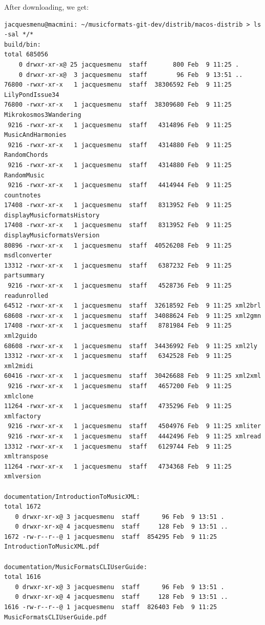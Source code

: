 
After downloading, we get:
\begin{lstlisting}[language=Terminal]
jacquesmenu@macmini: ~/musicformats-git-dev/distrib/macos-distrib > ls -sal */*
build/bin:
total 685056
    0 drwxr-xr-x@ 25 jacquesmenu  staff       800 Feb  9 11:25 .
    0 drwxr-xr-x@  3 jacquesmenu  staff        96 Feb  9 13:51 ..
76800 -rwxr-xr-x   1 jacquesmenu  staff  38306592 Feb  9 11:25 LilyPondIssue34
76800 -rwxr-xr-x   1 jacquesmenu  staff  38309680 Feb  9 11:25 Mikrokosmos3Wandering
 9216 -rwxr-xr-x   1 jacquesmenu  staff   4314896 Feb  9 11:25 MusicAndHarmonies
 9216 -rwxr-xr-x   1 jacquesmenu  staff   4314880 Feb  9 11:25 RandomChords
 9216 -rwxr-xr-x   1 jacquesmenu  staff   4314880 Feb  9 11:25 RandomMusic
 9216 -rwxr-xr-x   1 jacquesmenu  staff   4414944 Feb  9 11:25 countnotes
17408 -rwxr-xr-x   1 jacquesmenu  staff   8313952 Feb  9 11:25 displayMusicformatsHistory
17408 -rwxr-xr-x   1 jacquesmenu  staff   8313952 Feb  9 11:25 displayMusicformatsVersion
80896 -rwxr-xr-x   1 jacquesmenu  staff  40526208 Feb  9 11:25 msdlconverter
13312 -rwxr-xr-x   1 jacquesmenu  staff   6387232 Feb  9 11:25 partsummary
 9216 -rwxr-xr-x   1 jacquesmenu  staff   4528736 Feb  9 11:25 readunrolled
64512 -rwxr-xr-x   1 jacquesmenu  staff  32618592 Feb  9 11:25 xml2brl
68608 -rwxr-xr-x   1 jacquesmenu  staff  34088624 Feb  9 11:25 xml2gmn
17408 -rwxr-xr-x   1 jacquesmenu  staff   8781984 Feb  9 11:25 xml2guido
68608 -rwxr-xr-x   1 jacquesmenu  staff  34436992 Feb  9 11:25 xml2ly
13312 -rwxr-xr-x   1 jacquesmenu  staff   6342528 Feb  9 11:25 xml2midi
60416 -rwxr-xr-x   1 jacquesmenu  staff  30426688 Feb  9 11:25 xml2xml
 9216 -rwxr-xr-x   1 jacquesmenu  staff   4657200 Feb  9 11:25 xmlclone
11264 -rwxr-xr-x   1 jacquesmenu  staff   4735296 Feb  9 11:25 xmlfactory
 9216 -rwxr-xr-x   1 jacquesmenu  staff   4504976 Feb  9 11:25 xmliter
 9216 -rwxr-xr-x   1 jacquesmenu  staff   4442496 Feb  9 11:25 xmlread
13312 -rwxr-xr-x   1 jacquesmenu  staff   6129744 Feb  9 11:25 xmltranspose
11264 -rwxr-xr-x   1 jacquesmenu  staff   4734368 Feb  9 11:25 xmlversion

documentation/IntroductionToMusicXML:
total 1672
   0 drwxr-xr-x@ 3 jacquesmenu  staff      96 Feb  9 13:51 .
   0 drwxr-xr-x@ 4 jacquesmenu  staff     128 Feb  9 13:51 ..
1672 -rw-r--r--@ 1 jacquesmenu  staff  854295 Feb  9 11:25 IntroductionToMusicXML.pdf

documentation/MusicFormatsCLIUserGuide:
total 1616
   0 drwxr-xr-x@ 3 jacquesmenu  staff      96 Feb  9 13:51 .
   0 drwxr-xr-x@ 4 jacquesmenu  staff     128 Feb  9 13:51 ..
1616 -rw-r--r--@ 1 jacquesmenu  staff  826403 Feb  9 11:25 MusicFormatsCLIUserGuide.pdf
\end{lstlisting}

